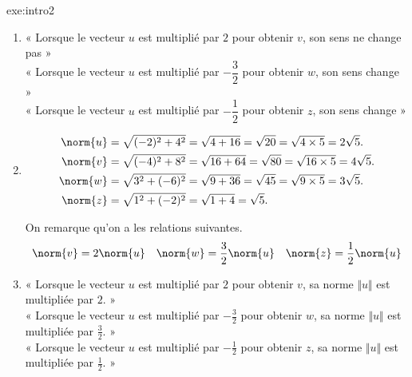 {}{exe:intro2}{
	\begin{enumerate}
		\item
			\begin{center}
				« Lorsque le vecteur $u$ est multiplié par {\color{RED_E} $2$} pour obtenir $v$, son sens {\color{RED_E} ne change pas} » \\[10pt]
				« Lorsque le vecteur $u$ est multiplié par  {\color{RED_E} $-\dfrac32$} pour obtenir $w$, son sens {\color{RED_E} change} » \\[10pt]
				« Lorsque le vecteur $u$ est multiplié par  {\color{RED_E} $-\dfrac12$} pour obtenir $z$, son sens {\color{RED_E} change} »
			\end{center}
		\item
			\begin{align*}
				\norm{u} &= \sqrt{(-2)^2 + 4^2} = \sqrt{4 + 16} = \sqrt{20} = \sqrt{4 \times 5} = 2 \sqrt{5}. \\
				\norm{v} &= \sqrt{(-4)^2 + 8^2} = \sqrt{16 + 64} = \sqrt{80} = \sqrt{16 \times 5} = 4\sqrt{5}. \\
				\norm{w} &= \sqrt{3^2 + (-6)^2} = \sqrt{9 + 36} = \sqrt{45} = \sqrt{9 \times 5} = 3 \sqrt{5}. \\
				\norm{z} &= \sqrt{1^2 + (-2)^2} = \sqrt{1 + 4} = \sqrt{5}.
			\end{align*}
	
		On remarque qu'on a les relations suivantes.
			\begin{align*}
				\norm{v} = 2 \norm{u} && \norm{w} = \dfrac32 \norm{u} && \norm{z} = \dfrac12 \norm{u}
			\end{align*}
		\item
			\begin{center}
				« Lorsque le vecteur $u$ est multiplié par {\color{RED_E} $2$} pour obtenir $v$, sa norme $\Vert u\Vert$ est multipliée par {\color{RED_E} $2$}. » \\[10pt]
				« Lorsque le vecteur $u$ est multiplié par {\color{RED_E} $-\frac32$} pour obtenir $w$, sa norme $\Vert u\Vert$ est multipliée par {\color{RED_E} $\frac32$}. » \\[10pt]
				« Lorsque le vecteur $u$ est multiplié par {\color{RED_E} $-\frac12$} pour obtenir $z$, sa norme $\Vert u\Vert$ est multipliée par {\color{RED_E} $\frac12$}. »
			\end{center}
	\end{enumerate}
}

